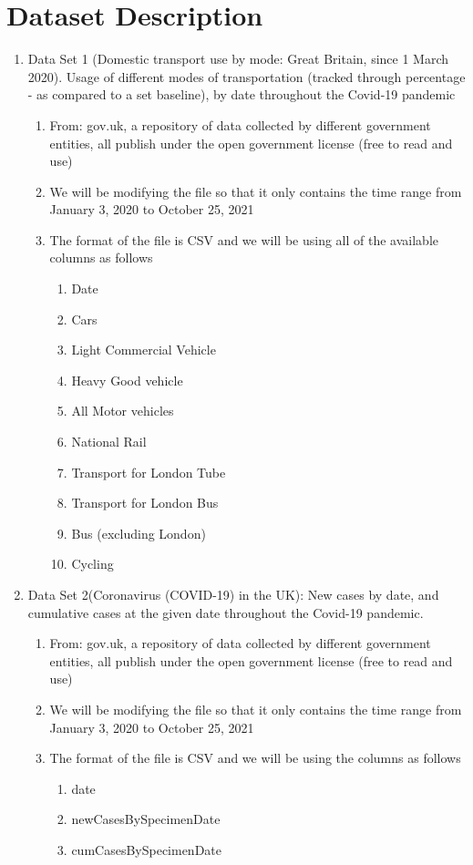 \documentclass[fontsize=11pt]{article}
\begin{document}
  
\section*{Dataset Description}  
  
\begin{enumerate}  
    \item Data Set 1 (Domestic transport use by mode: Great Britain, since 1 March 2020).
Usage of different modes of transportation (tracked through percentage - as compared to a set baseline), by date throughout the Covid-19 pandemic
    \begin{enumerate}  
        \item From: gov.uk,  a repository of data collected by different government entities, all publish under the open government license (free to read and use)
        \item We will be modifying the file so that it only contains the time range from January 3, 2020 to October 25, 2021
        \item The format of the file is CSV and we will be using all of the available columns as follows
        \begin{enumerate}
            \item Date
            \item Cars
            \item Light Commercial Vehicle
            \item Heavy Good vehicle
            \item All Motor vehicles
            \item National Rail
            \item Transport for London Tube
            \item  Transport for London Bus
            \item Bus (excluding London)
            \item Cycling
        \end{enumerate}
    \end{enumerate}  
    \item Data Set 2(Coronavirus (COVID-19) in the UK): New cases by date, and cumulative cases at the given date throughout the Covid-19 pandemic.
    \begin{enumerate}  
        \item From: gov.uk,  a repository of data collected by different government entities, all publish under the open government license (free to read and use) 
        \item We will be modifying the file so that it only contains the time range from January 3, 2020 to October 25, 2021
        \item The format of the file is CSV and we will be using the columns as follows
        \begin{enumerate}
            \item date
            \item newCasesBySpecimenDate
            \item cumCasesBySpecimenDate
        \end{enumerate}

    \end{enumerate}  
\end{enumerate}   
\end{document}
